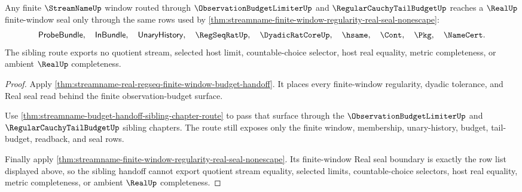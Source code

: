 \begin{theorem}
\label{thm:streamname-regular-seal-sibling-route}
Any finite $\StreamNameUp$ window routed through $\ObservationBudgetLimiterUp$
and $\RegularCauchyTailBudgetUp$ reaches a $\RealUp$ finite-window seal only
through the same rows used by
\autoref{thm:streamname-finite-window-regularity-real-seal-nonescape}:
$$
\mathsf{ProbeBundle},\quad \mathsf{InBundle},\quad
\mathsf{UnaryHistory},\quad \RegSeqRatUp,\quad \DyadicRatCoreUp,\quad
\hsame,\quad \Cont,\quad \Pkg,\quad \NameCert.
$$
The sibling route exports no quotient stream, selected host limit,
countable-choice selector, host real equality, metric completeness, or ambient
$\RealUp$ completeness.
\end{theorem}
\begin{proof}
Apply \autoref{thm:streamname-real-regseq-finite-window-budget-handoff}. It
places every finite-window regularity, dyadic tolerance, and Real seal read
behind the finite observation-budget surface.

Use \autoref{thm:streamname-budget-handoff-sibling-chapter-route} to pass that
surface through the $\ObservationBudgetLimiterUp$ and
$\RegularCauchyTailBudgetUp$ sibling chapters. The route still exposes only the
finite window, membership, unary-history, budget, tail-budget, readback, and
seal rows.

Finally apply
\autoref{thm:streamname-finite-window-regularity-real-seal-nonescape}. Its
finite-window Real seal boundary is exactly the row list displayed above, so
the sibling handoff cannot export quotient stream equality, selected limits,
countable-choice selectors, host real equality, metric completeness, or ambient
$\RealUp$ completeness.
\end{proof}

